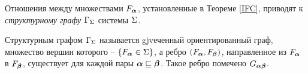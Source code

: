 % 
% 

%
%
%
%
%

Отношения между множествами $F_{\bm{\alpha}}$, установленные в Теореме \ref{IFC}, приводят к {\em структурному графу $\Gamma_\Sigma$} системы $\Sigma$. 

\begin{definition}
Структурным графом $\Gamma_\Sigma$ называется gjvеченный ориентированный граф, множество вершин  которого -- $\{F_{\bm{\alpha}}\in\Sigma\}$, а  ребро $(F_{\bm{\alpha}},F_{\bm{\beta}})$, направленное из $F_{\bm{\alpha}}$ в $F_{\bm{\beta}}$, существует для каждой пары ${\bm{\alpha}}\sqsubseteq{\bm{\beta}}$.  Такое ребро помечено  $G_{{\bm{\alpha}}{\bm{\beta}}}$.
\end{definition}

